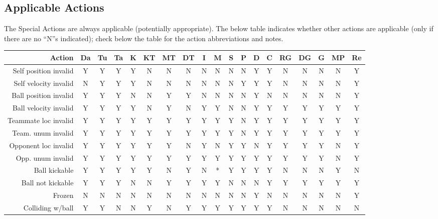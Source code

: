 \documentclass[12pt]{article}
\begin{document}
\subsection{Applicable Actions}
The Special Actions are always applicable (potentially appropriate). The below table indicates whether
other actions are applicable (only if there are no ``N''s indicated); check
below the table for the action abbreviations and notes.

\begin{center}
{\footnotesize
\begin{tabular}{r       | c    c    c    c | c    c    c    c | c   c   c   c   c   c    c    c   c    c}
Action                  & Da & Tu & Ta & K & KT & MT & DT & I & M & S & P & D & C & RG & DG & G & MP & Re \\
\hline \hline
Self position invalid   & Y  & Y  & Y  & Y & N  & N  & N  & N & N & N & N & Y & Y & N  & N  & N & N  & Y \\
Self velocity invalid   & N  & Y  & Y  & Y & N  & N  & N  & N & N & N & Y & Y & Y & N  & N  & N & N  & Y \\
Ball position invalid   & Y  & Y  & Y  & N & N  & Y  & Y  & N & N & N & N & Y & N & N  & N  & N & N  & Y \\
Ball velocity invalid   & Y  & Y  & Y  & Y & N  & Y  & N  & Y & Y & N & N & Y & Y & Y  & Y  & Y & Y  & Y \\
Teammate loc invalid    & Y  & Y  & Y  & Y & Y  & Y  & Y  & Y & Y & Y & N & Y & Y & Y  & Y  & Y & Y  & Y \\
Team. unum invalid      & Y  & Y  & Y  & Y & Y  & Y  & Y  & Y & Y & Y & N & Y & Y & Y  & Y  & Y & Y  & Y \\
Opponent loc invalid    & Y  & Y  & Y  & Y & Y  & Y  & N  & Y & N & Y & Y & N & Y & Y  & Y  & Y & N  & Y \\
Opp. unum invalid       & Y  & Y  & Y  & Y & Y  & Y  & Y  & Y & Y & Y & Y & Y & Y & Y  & Y  & Y & N  & Y \\
\hline
Ball kickable           & Y  & Y  & Y  & Y & Y  & N  & Y  & N & * & Y & Y & Y & Y & N  & N  & N & Y  & N \\
Ball not kickable       & Y  & Y  & Y  & N & N  & Y  & Y  & Y & Y & N & N & N & Y & Y  & Y  & Y & Y  & Y \\
\hline
Frozen                  & N  & N  & N  & N & N  & N  & N  & N & N & N & N & Y & N & N  & N  & N & N  & Y \\
Colliding w/ball        & Y  & Y  & N  & N & Y  & N  & Y  & Y & Y & Y & Y & Y & Y & N  & N  & N & N  & N \\

\end{tabular}}
\end{center}
\end{document}
